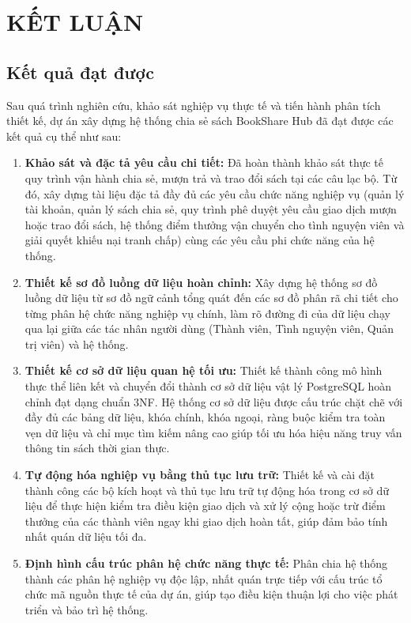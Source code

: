 
\section{KẾT LUẬN}

\subsection{Kết quả đạt được}

Sau quá trình nghiên cứu, khảo sát nghiệp vụ thực tế và tiến hành phân tích thiết kế, dự án xây dựng hệ thống chia sẻ sách BookShare Hub đã đạt được các kết quả cụ thể như sau:

\begin{enumerate}
    \item \textbf{Khảo sát và đặc tả yêu cầu chi tiết:} Đã hoàn thành khảo sát thực tế quy trình vận hành chia sẻ, mượn trả và trao đổi sách tại các câu lạc bộ. Từ đó, xây dựng tài liệu đặc tả đầy đủ các yêu cầu chức năng nghiệp vụ (quản lý tài khoản, quản lý sách chia sẻ, quy trình phê duyệt yêu cầu giao dịch mượn hoặc trao đổi sách, hệ thống điểm thưởng vận chuyển cho tình nguyện viên và giải quyết khiếu nại tranh chấp) cùng các yêu cầu phi chức năng của hệ thống.
    \item \textbf{Thiết kế sơ đồ luồng dữ liệu hoàn chỉnh:} Xây dựng hệ thống sơ đồ luồng dữ liệu từ sơ đồ ngữ cảnh tổng quát đến các sơ đồ phân rã chi tiết cho từng phân hệ chức năng nghiệp vụ chính, làm rõ đường đi của dữ liệu chạy qua lại giữa các tác nhân người dùng (Thành viên, Tình nguyện viên, Quản trị viên) và hệ thống.
    \item \textbf{Thiết kế cơ sở dữ liệu quan hệ tối ưu:} Thiết kế thành công mô hình thực thể liên kết và chuyển đổi thành cơ sở dữ liệu vật lý PostgreSQL hoàn chỉnh đạt dạng chuẩn 3NF. Hệ thống cơ sở dữ liệu được cấu trúc chặt chẽ với đầy đủ các bảng dữ liệu, khóa chính, khóa ngoại, ràng buộc kiểm tra toàn vẹn dữ liệu và chỉ mục tìm kiếm nâng cao giúp tối ưu hóa hiệu năng truy vấn thông tin sách thời gian thực.
    \item \textbf{Tự động hóa nghiệp vụ bằng thủ tục lưu trữ:} Thiết kế và cài đặt thành công các bộ kích hoạt và thủ tục lưu trữ tự động hóa trong cơ sở dữ liệu để thực hiện kiểm tra điều kiện giao dịch và xử lý cộng hoặc trừ điểm thưởng của các thành viên ngay khi giao dịch hoàn tất, giúp đảm bảo tính nhất quán dữ liệu tối đa.
    \item \textbf{Định hình cấu trúc phân hệ chức năng thực tế:} Phân chia hệ thống thành các phân hệ nghiệp vụ độc lập, nhất quán trực tiếp với cấu trúc tổ chức mã nguồn thực tế của dự án, giúp tạo điều kiện thuận lợi cho việc phát triển và bảo trì hệ thống.
\end{enumerate}

